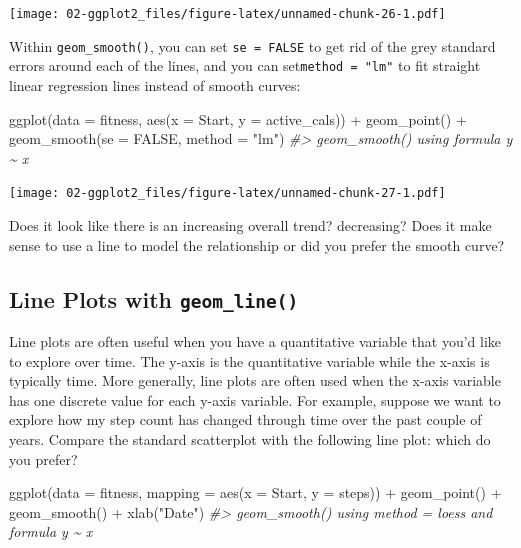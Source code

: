 \documentclass[
]{book}
\newenvironment{Shaded}{\begin{snugshade}}{\end{snugshade}}
\newcommand{\AttributeTok}[1]{\textcolor[rgb]{0.77,0.63,0.00}{#1}}
\newcommand{\CommentTok}[1]{\textcolor[rgb]{0.56,0.35,0.01}{\textit{#1}}}
\newcommand{\ConstantTok}[1]{\textcolor[rgb]{0.00,0.00,0.00}{#1}}
\newcommand{\FunctionTok}[1]{\textcolor[rgb]{0.00,0.00,0.00}{#1}}
\newcommand{\NormalTok}[1]{#1}
\newcommand{\SpecialCharTok}[1]{\textcolor[rgb]{0.00,0.00,0.00}{#1}}
\newcommand{\StringTok}[1]{\textcolor[rgb]{0.31,0.60,0.02}{#1}}
\begin{document}
\texttt{[image: 02-ggplot2\_files/figure-latex/unnamed-chunk-26-1.pdf]}

Within \texttt{geom\_smooth()}, you can set \texttt{se\ =\ FALSE} to get rid of the grey standard errors around each of the lines, and you can set\texttt{method\ =\ "lm"} to fit straight linear regression lines instead of smooth curves:

\begin{Shaded}
\begin{Highlighting}[]
\FunctionTok{ggplot}\NormalTok{(}\AttributeTok{data =}\NormalTok{ fitness, }\FunctionTok{aes}\NormalTok{(}\AttributeTok{x =}\NormalTok{ Start, }\AttributeTok{y =}\NormalTok{ active\_cals)) }\SpecialCharTok{+}
  \FunctionTok{geom\_point}\NormalTok{() }\SpecialCharTok{+}
  \FunctionTok{geom\_smooth}\NormalTok{(}\AttributeTok{se =} \ConstantTok{FALSE}\NormalTok{, }\AttributeTok{method =} \StringTok{"lm"}\NormalTok{)}
\CommentTok{\#\textgreater{} \textasciigrave{}geom\_smooth()\textasciigrave{} using formula \textquotesingle{}y \textasciitilde{} x\textquotesingle{}}
\end{Highlighting}
\end{Shaded}

\texttt{[image: 02-ggplot2\_files/figure-latex/unnamed-chunk-27-1.pdf]}

Does it look like there is an increasing overall trend? decreasing? Does it make sense to use a line to model the relationship or did you prefer the smooth curve?

\hypertarget{line-plots-with-geom_line}{%
\subsection{\texorpdfstring{Line Plots with \texttt{geom\_line()}}{Line Plots with geom\_line()}}\label{line-plots-with-geom_line}}

Line plots are often useful when you have a quantitative variable that you'd like to explore over time. The y-axis is the quantitative variable while the x-axis is typically time. More generally, line plots are often used when the x-axis variable has one discrete value for each y-axis variable. For example, suppose we want to explore how my step count has changed through time over the past couple of years. Compare the standard scatterplot with the following line plot: which do you prefer?

\begin{Shaded}
\begin{Highlighting}[]
\FunctionTok{ggplot}\NormalTok{(}\AttributeTok{data =}\NormalTok{ fitness, }\AttributeTok{mapping =} \FunctionTok{aes}\NormalTok{(}\AttributeTok{x =}\NormalTok{ Start, }\AttributeTok{y =}\NormalTok{ steps)) }\SpecialCharTok{+}
  \FunctionTok{geom\_point}\NormalTok{() }\SpecialCharTok{+} \FunctionTok{geom\_smooth}\NormalTok{() }\SpecialCharTok{+} \FunctionTok{xlab}\NormalTok{(}\StringTok{"Date"}\NormalTok{)}
\CommentTok{\#\textgreater{} \textasciigrave{}geom\_smooth()\textasciigrave{} using method = \textquotesingle{}loess\textquotesingle{} and formula \textquotesingle{}y \textasciitilde{} x\textquotesingle{}}
\end{Highlighting}
\end{Shaded}
\end{document}
